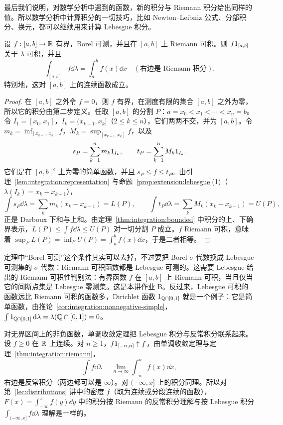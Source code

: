 
最后我们说明，对数学分析中遇到的函数，新的积分与 Riemann 积分给出同样的值。所以数学分析中计算积分的一切技巧，比如 Newton--Leibniz 公式、分部积分、换元，都可以继续用来计算 Lebesgue 积分。

\begin{theorem}\label{thm:integration:riemann}
设 $f:[a,b]\to\mathbb{R}$ 有界，Borel 可测，并且在 $[a,b]$ 上 Riemann 可积。则 $f1_{[a,b]}$ 关于 $\lambda$ 可积，并且
\[
\int_{[a,b]}f\dd\lambda=\int_a^bf(x)\dd x\quad(\text{右边是 Riemann 积分}).
\]
特别地，这对 $[a,b]$ 上的连续函数成立。
\end{theorem}
\begin{proof}
在 $[a,b]$ 之外令 $f=0$，则 $f$ 有界，在测度有限的集合 $[a,b]$ 之外为零，所以它的积分由第二步定义。任取 $[a,b]$ 的分割 $P$：$a=x_0<x_1<\cdots<x_n=b$。令 $I_1=[x_0,x_1]$，$I_k=(x_{k-1},x_k]$（$2\leqslant k\leqslant n$），它们两两不交，并为 $[a,b]$。令 $m_k=\inf_{[x_{k-1},x_k]}f$，$M_k=\sup_{[x_{k-1},x_k]}f$，以及
\[
s_P=\sum_{k=1}^nm_k1_{I_k},\qquad t_P=\sum_{k=1}^nM_k1_{I_k}.
\]
它们是在 $[a,b]^c$ 上为零的简单函数，并且 $s_P\leqslant f\leqslant t_P$。由引理~\ref{lem:integration:representation} 与命题~\ref{prop:extension:lebesgue}(1)（$\lambda(I_k)=x_k-x_{k-1}$），
\[
\int s_P\dd\lambda=\sum_km_k(x_k-x_{k-1})=L(P),\qquad\int t_P\dd\lambda=\sum_kM_k(x_k-x_{k-1})=U(P),
\]
正是 Darboux 下和与上和。由定理~\ref{thm:integration:bounded} 中积分的上、下确界表示，$L(P)\leqslant\int f\dd\lambda\leqslant U(P)$ 对一切分割 $P$ 成立。$f$ Riemann 可积，意味着 $\sup_PL(P)=\inf_PU(P)=\int_a^bf(x)\dd x$，于是二者相等。
\end{proof}

\begin{remark}
定理中“Borel 可测”这个条件其实可以去掉，不过要把 Borel $\sigma$-代数换成 Lebesgue 可测集的 $\sigma$-代数：Riemann 可积函数都是 Lebesgue 可测的。这需要 Lebesgue 给出的 Riemann 可积性判别法：有界函数 $f$ 在 $[a,b]$ 上 Riemann 可积，当且仅当它的间断点集是 Lebesgue 零测集。这是本讲作业 B。反过来，Lebesgue 可积的函数远比 Riemann 可积的函数多，Dirichlet 函数 $1_{\mathbb{Q}\cap[0,1]}$ 就是一个例子：它是简单函数，由推论~\ref{cor:integration:nonnegative-simple}，$\int1_{\mathbb{Q}\cap[0,1]}\,\mathrm{d}\lambda=\lambda(\mathbb{Q}\cap[0,1])=0$。
\end{remark}

对无界区间上的非负函数，单调收敛定理把 Lebesgue 积分与反常积分联系起来。设 $f\geqslant0$ 在 $\mathbb{R}$ 上连续。对 $n\geqslant1$，$f1_{[-n,n]}\uparrow f$，由单调收敛定理与定理~\ref{thm:integration:riemann}，
\[
\int f\dd\lambda=\lim_{n\to\infty}\int_{-n}^nf(x)\dd x,
\]
右边是反常积分（两边都可以是 $\infty$）。对 $(-\infty,x]$ 上的积分同理。所以对第~\ref{lec:distributions} 讲中的密度 $f$（取为连续或分段连续的函数），$F(x)=\int_{-\infty}^xf(y)\dd y$ 中的积分按 Riemann 的反常积分理解与按 Lebesgue 积分 $\int_{(-\infty,x]}f\dd\lambda$ 理解是一样的。

